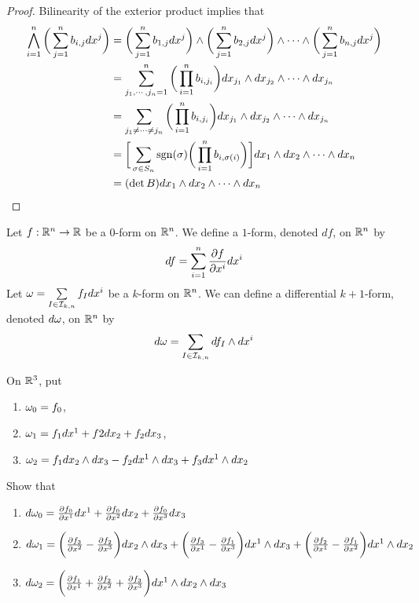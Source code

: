 \documentclass{book}
\begin{document}
	\begin{proof}
		Bilinearity of the exterior product implies that
		\begin{align*}
			\bigwedge_{i=1}^n \bigg(\sum_{j=1}^n b_{i,j}dx^j\bigg)
			 & =\bigg(\sum_{j=1}^n b_{1,j}dx^j\bigg) \wedge \bigg(\sum_{j=1}^n b_{2,j}dx^j\bigg) \wedge \cdots \wedge \bigg(\sum_{j=1}^n b_{n,j}dx^j\bigg) \\
			 & = \sum_{j_1, \cdots, j_n = 1}^n \bigg( \prod_{i=1}^n b_{i, j_i} \bigg) dx_{j_1}\wedge  dx_{j_2} \wedge \cdots \wedge  dx_{j_n} \\
			 & = \sum_{j_1 \neq \cdots \neq j_n} \bigg( \prod_{i=1}^n b_{i, j_i} \bigg) dx_{j_1}\wedge  dx_{j_2} \wedge \cdots \wedge  dx_{j_n} \\
			 & = \bigg[ \sum_{\sigma \in S_n} \operatorname{sgn}(\sigma) \bigg(\prod_{i=1}^n b_{i, \sigma(i)} \bigg) \bigg] dx_{1}\wedge  dx_{2} \wedge \cdots \wedge  dx_{n} \\
			 & = (\det B) dx_{1}\wedge  dx_{2} \wedge \cdots \wedge  dx_{n}
		\end{align*} 
		
	\end{proof}

	\begin{defn}
		Let $f: \mathbb{R}^n \rightarrow \mathbb{R}$ be a $0$-form on $\mathbb{R}^n$. We define a $1$-form, denoted $df$, on $\mathbb{R}^n$ by $$df = \sum_{i = 1}^n \frac{\partial f}{\partial x^i} dx^i$$
		Let $\omega = \sum\limits_{I \in \mathcal{I}_{k,n}} f_Idx^i$ be a $k$-form on $\mathbb{R}^n$. We can define a differential $k+1$-form, denoted $d \omega$, on $\mathbb{R}^n$ by $$d\omega = \sum\limits_{I \in \mathcal{I}_{k,n}} df_I\wedge dx^i$$  
	\end{defn}

	\begin{ex}
		On $\mathbb{R}^3$, put 
		\begin{enumerate}
			\item $\omega_0 = f_0$, 
			\item $\omega_1 = f_1 dx^1 + f2 dx_2 + f_2 dx_3$, 
			\item $\omega_2 = f_1dx_2\wedge dx_3 - f_2 dx^1 \wedge dx_3 + f_3 dx^1 \wedge dx_2$
		\end{enumerate} 
		Show that
		\begin{enumerate}
			\item $d\omega_0 = \frac{\partial f_0}{\partial x^1}dx^1 + \frac{\partial f_0}{\partial x^2}dx_2 + \frac{\partial f_0}{\partial x^3}dx_3$
			\item $d \omega_1 = \bigg(\frac{\partial f_3}{\partial x^2} - \frac{\partial f_2}{\partial x^3} \bigg) dx_2 \wedge dx_3 + \bigg( \frac{\partial f_3}{\partial x^1} - \frac{\partial f_1}{\partial x^3}\bigg)dx^1 \wedge dx_3 + \bigg( \frac{\partial f_2}{\partial x^1} - \frac{\partial f_1}{\partial x^2} \bigg) dx^1 \wedge dx_2$
			\item $d \omega_2 = \bigg( \frac{\partial f_1}{\partial x^1} + \frac{\partial f_2}{\partial x^2} + \frac{\partial f_3}{\partial x^3} \bigg) dx^1 \wedge dx_2 \wedge dx_3$ 
		\end{enumerate}
	\end{ex}
\end{document}
